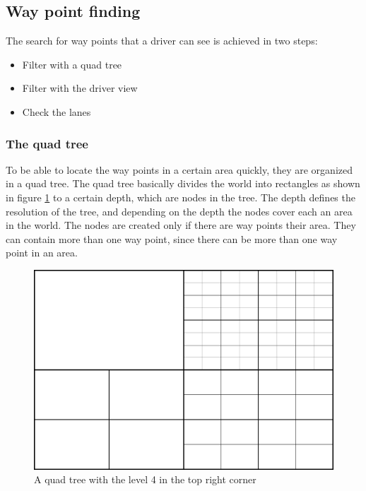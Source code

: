 \subsection{Way point finding}

The search for way points that a driver can see is achieved in two steps:

\begin{itemize}
\item Filter with a quad tree
\item Filter with the driver view
\item Check the lanes
\end{itemize}


\subsubsection{The quad tree}
\label{sec:quadTree}

To be able to locate the way points in a certain area quickly, they are 
organized in a quad tree. The quad tree basically divides the world into 
rectangles as shown in figure \ref{fig:quadTree} to a certain depth, which are 
nodes in the tree. The depth defines the resolution of the tree, and depending
on the depth the nodes cover each an area in the world. The nodes 
are created only if there are way points their area. They can contain
more than one way point, since there can be more than one way point in an 
area.\\

\begin{figure}[H]
\begin{center}
\includegraphics[scale=0.5]{images/quadtree.png}
\end{center}
\caption{A quad tree with the level 4 in the top right corner}
\label{fig:quadTree}
\end{figure}

